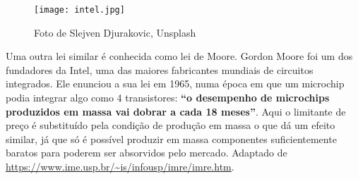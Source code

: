 \begin{knowledge}
\begin{itemize}
\begin{figure}[H]
\centering
\texttt{[image: intel.jpg]}
\caption{Foto de Slejven Djurakovic, Unsplash}
\end{figure}

Uma outra lei similar é conhecida como lei de Moore. Gordon Moore foi um dos fundadores da Intel, uma das maiores fabricantes mundiais de circuitos integrados. Ele enunciou a sua lei em 1965, numa época em que um microchip podia integrar algo como 4 transistores: \textbf{``o desempenho de microchips produzidos em massa vai dobrar a cada 18 meses''}. Aqui o limitante de preço é substituído pela condição de produção em massa o que dá um efeito similar, já que só é possível produzir em massa componentes suficientemente baratos para poderem ser absorvidos pelo mercado. Adaptado de \url{https://www.ime.usp.br/~is/infousp/imre/imre.htm}.

\end{itemize}

\end{knowledge}
\clearpage

